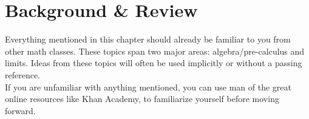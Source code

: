 \chapter{Background \& Review}
Everything mentioned in this chapter should already be familiar to you from other math classes.
These topics span two major areas: algebra/pre-calculus and limits.
Ideas from these topics will often be used implicitly or without a passing reference. \\

If you are unfamiliar with anything mentioned, you can use man of the great online resources like Khan Academy, to familiarize yourself before moving forward.


